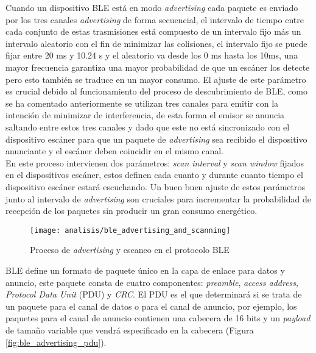 \documentclass[../proyecto.tex]{subfiles}
\begin{document}
Cuando un dispositivo BLE está en modo \textit{advertising} cada paquete es enviado por los tres canales \textit{advertising} de forma secuencial, el intervalo de tiempo entre cada conjunto de estas trasmisiones está compuesto de un intervalo fijo más un intervalo aleatorio con el fin de minimizar las colisiones, el intervalo fijo se puede fijar entre 20 ms y 10.24 s y el aleatorio va desde los 0 ms hasta los 10ms, una mayor frecuencia garantiza una mayor probabilidad de que un escáner los detecte pero esto también se traduce en un mayor consumo. El ajuste de este parámetro es crucial debido al funcionamiento del proceso de descubrimiento de BLE, como se ha comentado anteriormente se utilizan tres canales para emitir con la intención de minimizar de interferencia, de esta forma el emisor se anuncia saltando entre estos tres canales y dado que este no está sincronizado con el dispositivo escáner para que un paquete de \textit{advertising} sea recibido el dispositivo anunciante y el escáner deben coincidir en el mismo canal.\\

En este proceso intervienen dos parámetros:  \textit{scan interval} y  \textit{scan window} fijados en el dispositivos escáner, estos definen cada cuanto y durante cuanto tiempo el dispositivo escáner estará escuchando. Un buen buen ajuste de estos parámetros junto al intervalo de \textit{advertising} son cruciales para incrementar la probabilidad de recepción de los paquetes sin producir un gran consumo energético.\\

\begin{figure}[H]
\centering
\texttt{[image: analisis/ble\_advertising\_and\_scanning]}
\caption{Proceso de \textit{advertising} y escaneo en el protocolo BLE \cite{townsend2014getting}}
\label{fig:ble_advertising_and_scanning}
\end{figure}

BLE define un formato de paquete único en la capa de enlace para datos y anuncio, este paquete consta de cuatro componentes: \textit{preamble}, \textit{access address}, \textit{Protocol Data Unit} (PDU) y \textit{CRC}. El PDU es el que determinará si se trata de un paquete para el canal de datos o para el canal de anuncio, por ejemplo, los paquetes para el canal de anuncio contienen una cabecera de 16 bits y un \textit{payload} de tamaño variable que vendrá especificado en la cabecera (Figura \ref{fig:ble_advertising_pdu}). \\
\end{document}
